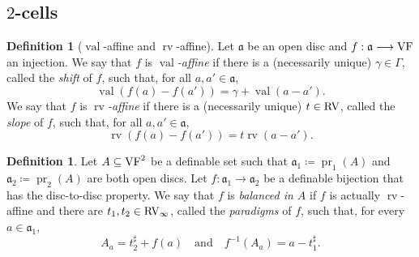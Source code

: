 \documentclass[12pt]{amsart}
\newcommand{\memph}[1]{{\color{magenta}\emph{#1}}}
\theoremstyle{plain}
\theoremstyle{definition}
\newtheorem{defn}[thm]{Definition}
\theoremstyle{remark}
\numberwithin{equation}{section}
\theoremstyle{plain}
\newcommand{\VF}{\textup{VF}}
\newcommand{\RV}{\textup{RV}}
\DeclareMathOperator{\pr}{pr}
\newcommand{\dand}{\quad \text{and} \quad}
\newcommand{\ga}{\mathfrak{a}}
\newcommand{\0}{\emptyset}
\newcommand{\fun}{\longrightarrow}
\newcommand{\sub}{\subseteq}
\DeclareMathOperator{\rv}{rv}
\DeclareMathOperator{\vv}{val}
\begin{document}
\subsection{$2$-cells}

\begin{defn}[$\vv$-affine and $\rv$-affine]\label{rvaffine}
Let $\ga$ be an open disc and $f : \ga \fun \VF$ an injection.
We say that $f$ is \memph{$\vv$-affine} if there is a (necessarily unique) $\gamma \in \Gamma$, called the \memph{shift} of $f$, such that, for all $a, a' \in \ga$,
\[
\vv(f(a) - f(a')) = \gamma + \vv(a - a').
\]
We say that $f$ is \memph{$\rv$-affine} if there is a (necessarily unique) $t \in \RV$, called the \memph{slope} of $f$, such that, for all $a, a' \in \ga$,
\[
\rv(f(a) - f(a')) = t \rv(a - a').
\]
\end{defn}

\begin{defn}\label{defn:balance}
Let $A \sub \VF^2$ be a definable set such that $\ga_1 \coloneqq \pr_1(A)$ and $\ga_2 \coloneqq \pr_2(A)$ are both open discs. Let $f : \ga_1 \fun \ga_2$ be a definable bijection that has the disc-to-disc property.  We say that $f$ is \memph{balanced in $A$} if $f$ is actually $\rv$-affine and there are $t_1, t_2 \in \RV_\infty$, called the \memph{paradigms} of $f$, such that, for every $a \in \ga_1$,
\[
A_a = t_2^\sharp + f(a) \dand f^{-1}(A_a) = a - t_1^\sharp.
\]
\end{defn}
\end{document}
